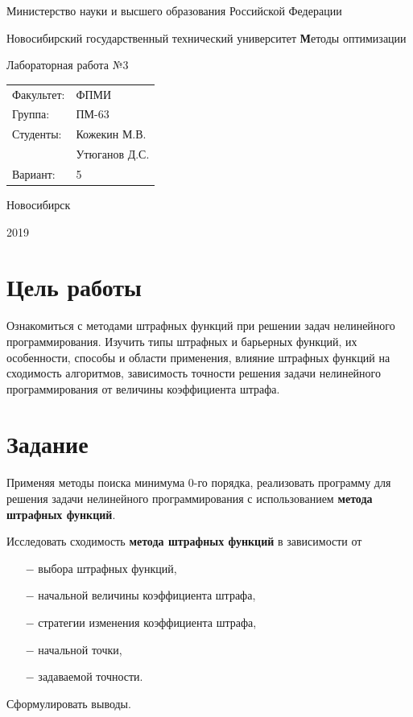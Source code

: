 \documentclass[12pt, a4paper]{article}
\newcommand{\insertTitle}[7]{
\begin{titlepage}
	\begin{center}
    	\large
		Министерство науки и высшего образования Российской Федерации
		
		Новосибирский государственный технический университет
		\vfill
		{\textbf #1}
		
		Лабораторная работа №#2
		\vfill
	\end{center}
	
	\begin{tabular}{ m{7em}  m{7em} }
	Факультет: & ФПМИ \\ 
	Группа: & #3 \\  
	Студенты: & #4 \\
	& #5 \\
	Вариант: & #6
	\end{tabular}
	\vfill

\begin{center}
Новосибирск

#7
\end{center}
\end{titlepage}
}
\begin{document}
\insertTitle{Методы оптимизации}{3}{ПМ-63}{Кожекин М.В.}{Утюганов Д.С.}{5}{2019}




\section{Цель работы}

Ознакомиться с методами штрафных функций при решении задач нелинейного программирования. Изучить типы штрафных и барьерных функций, их особенности, способы и области применения, влияние штрафных функций на сходимость алгоритмов, зависимость точности решения задачи нелинейного программирования от величины коэффициента штрафа.




\section{Задание}

Применяя методы поиска минимума 0-го порядка, реализовать программу для решения задачи нелинейного программирования с использованием {\bf метода штрафных функций}. 

Исследовать сходимость {\bf метода штрафных функций} в зависимости от
\begin{itemize}
	\item[$-$] выбора штрафных функций,
	\item[$-$] начальной величины коэффициента штрафа,
	\item[$-$] стратегии изменения коэффициента штрафа,
	\item[$-$] начальной точки,
	\item[$-$] задаваемой точности.
\end{itemize}

Сформулировать выводы.
\end{document}
